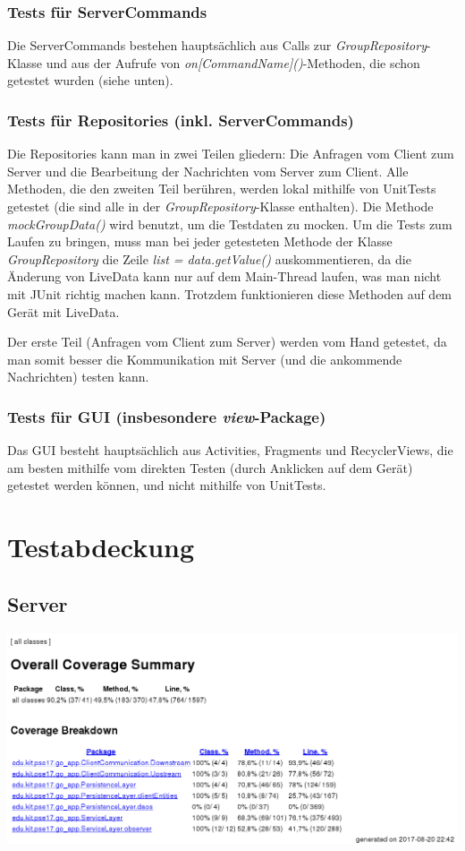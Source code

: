 \documentclass[11pt,a4paper]{scrartcl}
\begin{document}
\subsubsection{Tests für ServerCommands}
Die ServerCommands bestehen hauptsächlich aus Calls zur \textit{GroupRepository}-Klasse und aus der Aufrufe von \textit{on[CommandName]()}-Methoden, die schon getestet wurden (siehe unten).

\subsubsection{Tests für Repositories (inkl. ServerCommands)}
Die Repositories kann man in zwei Teilen gliedern: Die Anfragen vom Client zum Server und die Bearbeitung der Nachrichten vom Server zum Client. Alle Methoden, die den zweiten Teil berühren, werden lokal mithilfe von UnitTests getestet (die sind alle in der \textit{GroupRepository}-Klasse enthalten). Die Methode \textit{mockGroupData()} wird benutzt, um die Testdaten zu mocken. Um die Tests zum Laufen zu bringen, muss man bei jeder getesteten Methode der Klasse \textit{GroupRepository} die Zeile \textit{list = data.getValue()} auskommentieren, da die Änderung von LiveData kann nur auf dem Main-Thread laufen, was man nicht mit JUnit richtig machen kann. Trotzdem funktionieren diese Methoden auf dem Gerät mit LiveData.

Der erste Teil (Anfragen vom Client zum Server) werden vom Hand getestet, da man somit besser die Kommunikation mit Server (und die ankommende Nachrichten) testen kann.

\subsubsection{Tests für GUI (insbesondere \textit{view}-Package)}
Das GUI besteht hauptsächlich aus Activities, Fragments und RecyclerViews, die am besten mithilfe vom direkten Testen (durch Anklicken auf dem Gerät) getestet werden können, und nicht mithilfe von UnitTests. 


\newpage

\section{Testabdeckung}
\subsection{Server}


\begin{center}
	\includegraphics[width=1.0\linewidth]{ServerTestCoverage}
\end{center}
\end{document}
